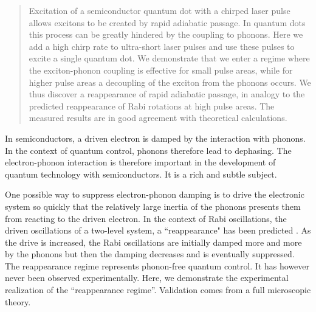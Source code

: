 \documentclass[aps,prl,reprint,superscriptaddress]{revtex4-1}
\begin{document}
\author{Richard J.\ Warburton}



\date{\today}

\begin{abstract}
Excitation of a semiconductor quantum dot with a chirped laser pulse allows excitons to be created by rapid adiabatic passage. In quantum dots this process can be greatly hindered by the coupling to phonons. Here we add a high chirp rate to ultra-short laser pulses and use these pulses to excite a single quantum dot. We demonstrate that we enter a regime where the exciton-phonon coupling is effective for small pulse areas, while for higher pulse areas a decoupling of the exciton from the phonons occurs. We thus discover a reappearance of rapid adiabatic passage, in analogy to the predicted reappearance of Rabi rotations at high pulse areas. The measured results are in good agreement with theoretical calculations.
\end{abstract}

\pacs{}%

\maketitle %

In semiconductors, a driven electron is damped by the interaction with phonons. In the context of quantum control, phonons therefore lead to dephasing. The electron-phonon interaction is therefore important in the development of quantum technology with semiconductors. It is a rich and subtle subject.

One possible way to suppress electron-phonon damping is to drive the electronic system so quickly that the relatively large inertia of the phonons presents them from reacting to the driven electron. In the context of Rabi oscillations, the driven oscillations of a two-level system, a ``reappearance" has been predicted \cite{vagov2007non}. As the drive is increased, the Rabi oscillations are initially damped more and more by the phonons but then the damping decreases and is eventually suppressed. The reappearance regime represents phonon-free quantum control. It has however never been observed experimentally. Here, we demonstrate the experimental realization of the “reappearance regime”. Validation comes from a full microscopic theory.
\end{document}
